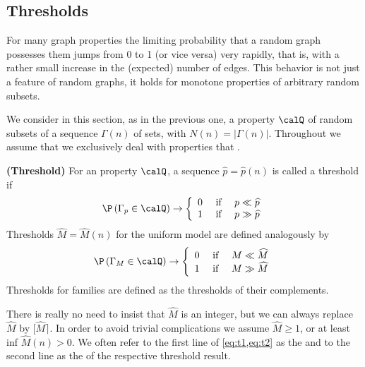 \documentclass{article}
\newcommand{\bfs}[1]{\textbf{({#1}) }}
\begin{document}
\subsection{Thresholds}
For many graph properties the limiting probability that a random graph possesses them jumps from 0 to 1 (or vice versa) very rapidly, that is, with a rather small increase in the (expected) number of edges. This behavior is not just a feature of random graphs, it holds for monotone properties of arbitrary random subsets.

We consider in this section, as in the previous one, a property $\calQ$ of random subsets of a sequence $\Gamma(n)$ of sets, with $N(n)=|\Gamma(n)|$. Throughout we assume that we exclusively deal with properties that .

\begin{defa}{\bfs{Threshold}}
For an  property $\calQ$, a sequence $\widehat{p}=\widehat{p}(n)$ is called a threshold if
\begin{align}
\P \left(\Gamma_{p} \in \calQ \right) \rightarrow\left\{\begin{array}{lll}
0 & \text { if } & p \ll \widehat{p} \\
1 & \text { if } & p \gg \widehat{p}\label{eq:t1}
\end{array}\right.
\end{align}
Thresholds $\widehat{M}=\widehat{M}(n)$ for the uniform model are defined analogously by
\begin{align}
\P \left(\Gamma_{M} \in \calQ \right) \rightarrow\left\{\begin{array}{lll}
0 & \text { if } & M \ll \widehat{M} \\
1 & \text { if } & M \gg \widehat{M}\label{eq:t2}
\end{array}\right.
\end{align} 
Thresholds for  families are defined as the thresholds of their complements.
\end{defa}
\begin{rema}
There is really no need to insist that $\widehat{M}$ is an integer, but we can always replace $\widehat{M}$ by $[\widehat{M}\rceil .$ In order to avoid trivial complications we assume $\widehat{M} \geq 1$, or at least inf $\widehat{M}(n)>0$.
 We often refer to the first line of \cref{eq:t1,eq:t2} as the  and to the second line as the  of the respective threshold result.
\end{rema}
\end{document}
